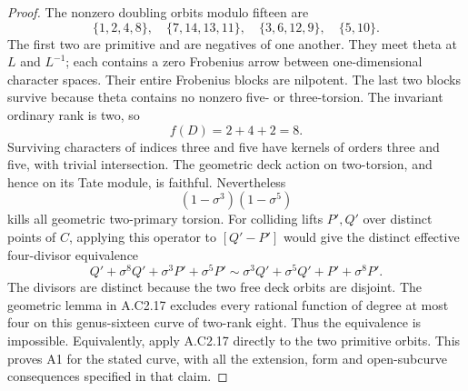 \begin{proof}
The nonzero doubling orbits modulo fifteen are
\[
 \{1,2,4,8\},\quad\{7,14,13,11\},\quad
                   \{3,6,12,9\},\quad\{5,10\}.                 \tag{C2.59}
\]
The first two are primitive and are negatives
of one another. They meet theta at $L$ and
$L^{-1}$; each contains a zero Frobenius arrow
between one-dimensional character spaces.
Their entire Frobenius blocks are nilpotent.
The last two blocks survive because theta
contains no nonzero five- or three-torsion.
The invariant ordinary rank is two, so
\[
                             f(D)=2+4+2=8.
\]
Surviving characters of indices three and five
have kernels of orders three and five, with
trivial intersection. The geometric deck action
on two-torsion, and hence on its Tate module,
is faithful. Nevertheless
\[
                    (1-\sigma^3)(1-\sigma^5)
\]
kills all geometric two-primary torsion.
For colliding lifts $P',Q'$ over distinct
points of $C$, applying this operator to
$[Q'-P']$ would give the distinct effective
four-divisor equivalence
\[
 Q'+\sigma^8Q'+\sigma^3P'+\sigma^5P'
       \sim\sigma^3Q'+\sigma^5Q'+P'+\sigma^8P'.                 \tag{C2.60}
\]
The divisors are distinct because the two free
deck orbits are disjoint. The geometric lemma
in A.C2.17 excludes every rational function
of degree at most four on this genus-sixteen
curve of two-rank eight. Thus the equivalence
is impossible. Equivalently, apply A.C2.17
directly to the two primitive orbits.
This proves A1 for the stated curve, with
all the extension, form and open-subcurve
consequences specified in that claim.


\end{proof}

